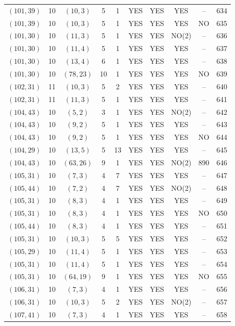 \begin{longtable}{|c|c|c|c|c|c|c|c|c|c|}
$(101, 39)$ & 10 & $(10, 3)$ & 5 & 1 & YES & YES & YES & -- & 634\\
$(101, 39)$ & 10 & $(10, 3)$ & 5 & 1 & YES & YES & YES & NO & 635\\
$(101, 30)$ & 10 & $(11, 3)$ & 5 & 1 & YES & YES & NO(2) & -- & 636\\
$(101, 30)$ & 10 & $(11, 4)$ & 5 & 1 & YES & YES & YES & -- & 637\\
$(101, 30)$ & 10 & $(13, 4)$ & 6 & 1 & YES & YES & YES & -- & 638\\
$(101, 30)$ & 10 & $(78, 23)$ & 10 & 1 & YES & YES & YES & NO & 639\\
$(102, 31)$ & 11 & $(10, 3)$ & 5 & 2 & YES & YES & YES & -- & 640\\
$(102, 31)$ & 11 & $(11, 3)$ & 5 & 1 & YES & YES & YES & -- & 641\\
$(104, 43)$ & 10 & $(5, 2)$ & 3 & 1 & YES & YES & NO(2) & -- & 642\\
$(104, 43)$ & 10 & $(9, 2)$ & 5 & 1 & YES & YES & YES & -- & 643\\
$(104, 43)$ & 10 & $(9, 2)$ & 5 & 1 & YES & YES & YES & NO & 644\\
$(104, 29)$ & 10 & $(13, 5)$ & 5 & 13 & YES & YES & YES & -- & 645\\
$(104, 43)$ & 10 & $(63, 26)$ & 9 & 1 & YES & YES & NO(2) & 890 & 646\\
$(105, 31)$ & 10 & $(7, 3)$ & 4 & 7 & YES & YES & YES & -- & 647\\
$(105, 44)$ & 10 & $(7, 2)$ & 4 & 7 & YES & YES & NO(2) & -- & 648\\
$(105, 31)$ & 10 & $(8, 3)$ & 4 & 1 & YES & YES & YES & -- & 649\\
$(105, 31)$ & 10 & $(8, 3)$ & 4 & 1 & YES & YES & YES & NO & 650\\
$(105, 44)$ & 10 & $(8, 3)$ & 4 & 1 & YES & YES & YES & -- & 651\\
$(105, 31)$ & 10 & $(10, 3)$ & 5 & 5 & YES & YES & YES & -- & 652\\
$(105, 29)$ & 10 & $(11, 4)$ & 5 & 1 & YES & YES & YES & -- & 653\\
$(105, 31)$ & 10 & $(11, 4)$ & 5 & 1 & YES & YES & YES & -- & 654\\
$(105, 31)$ & 10 & $(64, 19)$ & 9 & 1 & YES & YES & YES & NO & 655\\
$(106, 31)$ & 10 & $(7, 3)$ & 4 & 1 & YES & YES & YES & -- & 656\\
$(106, 31)$ & 10 & $(10, 3)$ & 5 & 2 & YES & YES & NO(2) & -- & 657\\
$(107, 41)$ & 10 & $(7, 3)$ & 4 & 1 & YES & YES & YES & -- & 658\\

\end{longtable}
